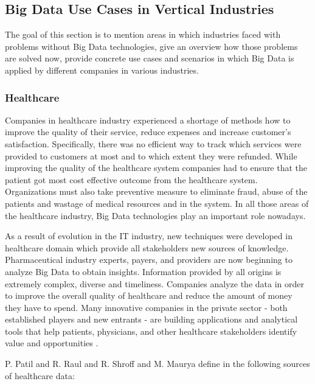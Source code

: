 \documentclass[runningheads]{llncs}
\begin{document}
\subsection{Big Data Use Cases in Vertical Industries}
The goal of this section is to mention areas in which industries faced with problems without Big Data technologies, give an overview how those problems are solved now, provide concrete use cases and scenarios in which Big Data is applied by different companies in various industries.

\subsubsection{Healthcare}

Companies in healthcare industry experienced a shortage of methods how to improve the quality of their service, reduce expenses and increase customer's satisfaction. Specifically, there was no efficient way to track which services were provided to customers at most and to which extent they were refunded. While improving the quality of the healthcare system companies had to ensure that the patient got most cost effective outcome from the healthcare system. Organizations must also take preventive measure to eliminate fraud, abuse of the patients and wastage of medical resources and in the system. In all those areas of the healthcare industry, Big Data technologies play an important role nowadays.

As a result of evolution in the IT industry, new techniques were developed in healthcare domain which provide all stakeholders new sources of knowledge. Pharmaceutical industry experts, payers, and providers are now beginning to analyze Big Data to obtain insights. Information provided by all origins is extremely complex, diverse and timeliness. Companies analyze the data in order to improve the overall quality of healthcare and reduce the amount of money they have to spend. Many innovative companies in the private sector - both established players and new entrants - are building applications and analytical tools that help patients, physicians, and other healthcare stakeholders identify value and opportunities \cite{USHEALTH}. 

P. Patil and R. Raul and R. Shroff and M. Maurya define in \cite{HEALTHARTICLE} the following sources of healthcare data:
\end{document}
